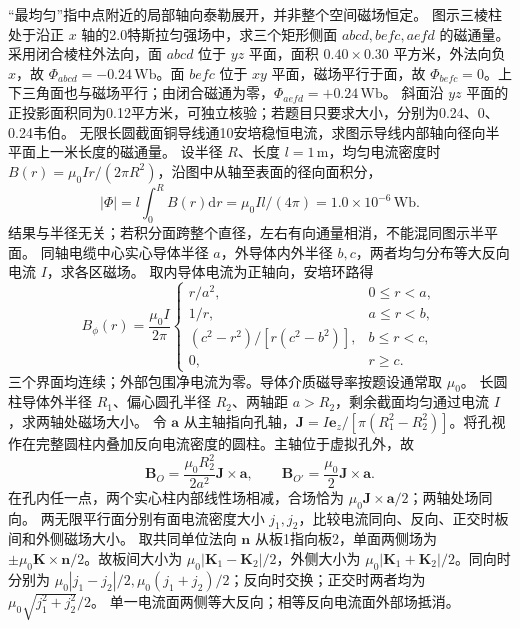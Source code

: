 \crosscheck “最均匀”指中点附近的局部轴向泰勒展开，并非整个空间磁场恒定。
\problemtext 图示三棱柱处于沿正 $x$ 轴的2.0特斯拉匀强场中，求三个矩形侧面 $abcd,befc,aefd$ 的磁通量。
\workings 采用闭合棱柱外法向，面 $abcd$ 位于 $yz$ 平面，面积 $0.40\times0.30$ 平方米，外法向负 $x$，故 $\Phi_{abcd}=-0.24\,\mathrm{Wb}$。面 $befc$ 位于 $xy$ 平面，磁场平行于面，故 $\Phi_{befc}=0$。上下三角面也与磁场平行；由闭合磁通为零，$\Phi_{aefd}=+0.24\,\mathrm{Wb}$。
\crosscheck 斜面沿 $yz$ 平面的正投影面积同为0.12平方米，可独立核验；若题目只要求大小，分别为0.24、0、0.24韦伯。
\problemtext 无限长圆截面铜导线通10安培稳恒电流，求图示导线内部轴向径向半平面上一米长度的磁通量。
\workings 设半径 $R$、长度 $l=1\,\mathrm m$，均匀电流密度时 $B(r)=\mu_0 Ir/(2\pi R^2)$，沿图中从轴至表面的径向面积分，
\[
|\Phi|=l\int_0^R B(r)\mathrm dr=\mu_0 Il/(4\pi)=1.0\times10^{-6}\,\mathrm{Wb}.
\]
\crosscheck 结果与半径无关；若积分面跨整个直径，左右有向通量相消，不能混同图示半平面。
\problemtext 同轴电缆中心实心导体半径 $a$，外导体内外半径 $b,c$，两者均匀分布等大反向电流 $I$，求各区磁场。
\workings 取内导体电流为正轴向，安培环路得
\[
B_\phi(r)=\frac{\mu_0 I}{2\pi}\begin{cases}
r/a^2,&0\le r<a,\\
1/r,&a\le r<b,\\
(c^2-r^2)/[r(c^2-b^2)],&b\le r<c,\\
0,&r\ge c .
\end{cases}
\]
\crosscheck 三个界面均连续；外部包围净电流为零。导体介质磁导率按题设通常取 $\mu_0$。
\problemtext 长圆柱导体外半径 $R_1$、偏心圆孔半径 $R_2$、两轴距 $a>R_2$，剩余截面均匀通过电流 $I$，求两轴处磁场大小。
\workings 令 $\bm a$ 从主轴指向孔轴，$\bm J=I\bm e_z/[\pi(R_1^2-R_2^2)]$。将孔视作在完整圆柱内叠加反向电流密度的圆柱。主轴位于虚拟孔外，故
\[
\bm B_O=\frac{\mu_0 R_2^2}{2a^2}\bm J\times\bm a,\qquad
\bm B_{O'}=\frac{\mu_0}{2}\bm J\times\bm a .
\]
\crosscheck 在孔内任一点，两个实心柱内部线性场相减，合场恰为 $\mu_0\bm J\times\bm a/2$；两轴处场同向。
\problemtext 两无限平行面分别有面电流密度大小 $j_1,j_2$，比较电流同向、反向、正交时板间和外侧磁场大小。
\workings 取共同单位法向 $\bm n$ 从板1指向板2，单面两侧场为 $\pm\mu_0\bm K\times\bm n/2$。故板间大小为 $\mu_0|\bm K_1-\bm K_2|/2$，外侧大小为 $\mu_0|\bm K_1+\bm K_2|/2$。同向时分别为 $\mu_0|j_1-j_2|/2,\mu_0(j_1+j_2)/2$；反向时交换；正交时两者均为 $\mu_0\sqrt{j_1^2+j_2^2}/2$。
\crosscheck 单一电流面两侧等大反向；相等反向电流面外部场抵消。
